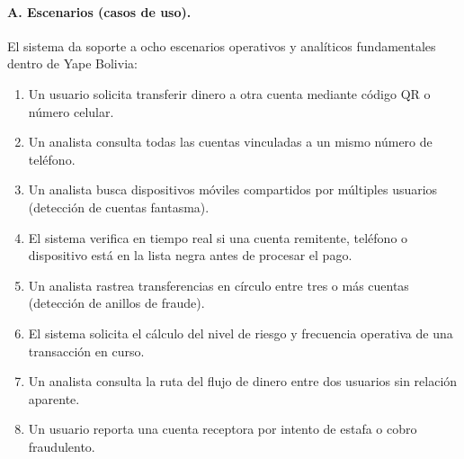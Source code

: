 \documentclass[11pt,a4paper]{article}
\begin{document}
	\paragraph{A. Escenarios (casos de uso).} El sistema da soporte a ocho escenarios operativos y analíticos fundamentales dentro de Yape Bolivia:
	\begin{enumerate}[leftmargin=2em]
		\item Un usuario solicita transferir dinero a otra cuenta mediante código QR o número celular.
		\item Un analista consulta todas las cuentas vinculadas a un mismo número de teléfono.
		\item Un analista busca dispositivos móviles compartidos por múltiples usuarios (detección de cuentas fantasma).
		\item El sistema verifica en tiempo real si una cuenta remitente, teléfono o dispositivo está en la lista negra antes de procesar el pago.
		\item Un analista rastrea transferencias en círculo entre tres o más cuentas (detección de anillos de fraude).
		\item El sistema solicita el cálculo del nivel de riesgo y frecuencia operativa de una transacción en curso.
		\item Un analista consulta la ruta del flujo de dinero entre dos usuarios sin relación aparente.
		\item Un usuario reporta una cuenta receptora por intento de estafa o cobro fraudulento.
	\end{enumerate}
	
\end{document}
